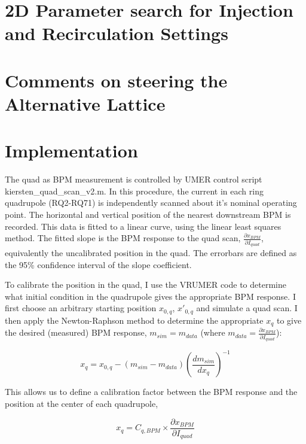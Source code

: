 \section{2D Parameter search for Injection and Recirculation Settings}



\section{Comments on steering the Alternative Lattice}



\section{Implementation}


The quad as BPM measurement is controlled by UMER control script \newline kiersten\_quad\_scan\_v2.m. 
In this procedure, the current in each ring quadrupole (RQ2-RQ71) is independently scanned about it's nominal 
operating point. The horizontal and vertical position of the nearest downstream BPM is recorded. This data is 
fitted to a linear curve, using the linear least squares method. The fitted slope is the BPM response to the 
quad scan, $\frac{\partial x_{BPM}}{\partial I_{quad}}$, equivalently the uncalibrated position in the quad. 
The errorbars are defined as the 95\% confidence interval of the slope coefficient. 

To calibrate the position in the quad, I use the VRUMER code to determine what initial condition in the quadrupole gives the appropriate BPM response.
I first choose an arbitrary starting position $x_{0,q}$, $x'_{0,q}$ and simulate a quad scan.
I then apply the Newton-Raphson method to determine the appropriate $x_q$ to give the desired (measured) BPM response, $m_{sim} = m_{data}$ (where $m_{data} = \frac{\partial x_{BPM}}{\partial I_{quad}}$): 


\begin{equation}
 x_q = x_{0,q} - \left( m_{sim} - m_{data} \right) \left(\frac{dm_{sim}}{dx_q}\right)^{-1}
\end{equation}

This allows us to define a calibration factor between the BPM response and the position at the center of each quadrupole, 

\begin{equation}
x_q = C_{q,BPM} \times \frac{\partial x_{BPM}}{\partial I_{quad}}
\end{equation}


